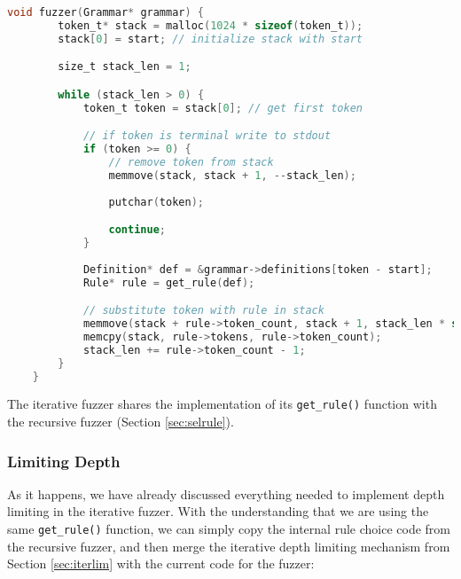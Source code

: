 \documentclass[8pt, twoside]{extarticle}
\begin{document}
\begin{lstlisting}[gobble=2, language=C, caption={Simple generic iterative fuzzer}] 
	void fuzzer(Grammar* grammar) {
		token_t* stack = malloc(1024 * sizeof(token_t));
		stack[0] = start; // initialize stack with start

		size_t stack_len = 1;

		while (stack_len > 0) {
			token_t token = stack[0]; // get first token

			// if token is terminal write to stdout
			if (token >= 0) {
				// remove token from stack
				memmove(stack, stack + 1, --stack_len);
				
				putchar(token);

				continue;
			}
			
			Definition* def = &grammar->definitions[token - start];
			Rule* rule = get_rule(def);

			// substitute token with rule in stack 
			memmove(stack + rule->token_count, stack + 1, stack_len * sizeof(token_t));
			memcpy(stack, rule->tokens, rule->token_count);
			stack_len += rule->token_count - 1;
		}
	}
\end{lstlisting}

The iterative fuzzer shares the implementation of its \verb|get_rule()| function with the recursive fuzzer (Section \ref{sec:selrule}).

\subsubsection{Limiting Depth}

As it happens, we have already discussed everything needed to implement depth limiting in the iterative fuzzer. With the understanding that we are using the same \verb|get_rule()| function, we can simply copy the internal rule choice code from the recursive fuzzer, and then merge the iterative depth limiting mechanism from Section \ref{sec:iterlim} with the current code for the fuzzer:
\end{document}
